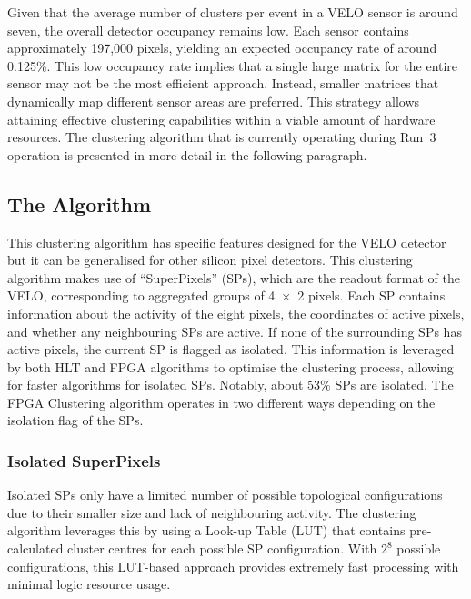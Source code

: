 Given that the average number of clusters per event in a VELO sensor is around seven, the overall detector occupancy remains low. Each sensor contains approximately 197,000 pixels, yielding an expected occupancy rate of around 0.125\%\cite{Bediaga:2013tje}. This low occupancy rate implies that a single large matrix for the entire sensor may not be the most efficient approach. Instead, smaller matrices that dynamically map different sensor areas are preferred. This strategy allows attaining effective clustering capabilities within a viable amount of hardware resources.
The clustering algorithm that is currently operating during Run~3 operation is presented in more detail in the following paragraph.

\subsection*{The Algorithm}
This clustering algorithm has specific features designed for the VELO detector but it can be generalised for other silicon pixel detectors. This clustering algorithm makes use of ``SuperPixels'' (SPs), which are the readout format of the VELO, corresponding to aggregated groups of 4~×~2 pixels. Each SP contains information about the activity of the eight pixels, the coordinates of active pixels, and whether any neighbouring SPs are active. If none of the surrounding SPs has active pixels, the current SP is flagged as isolated. This information is leveraged by both HLT and FPGA algorithms to optimise the clustering process, allowing for faster algorithms for isolated SPs. Notably, about 53\% SPs are isolated.
The FPGA Clustering algorithm operates in two different ways depending on the isolation flag of the SPs.
\subsubsection{Isolated SuperPixels}
Isolated SPs only have a limited number of possible topological configurations due to their smaller size and lack of neighbouring activity. The clustering algorithm leverages this by using a Look-up Table (LUT) that contains pre-calculated cluster centres for each possible SP configuration. With $2^8$ possible configurations, this LUT-based approach provides extremely fast processing with minimal logic resource usage.

